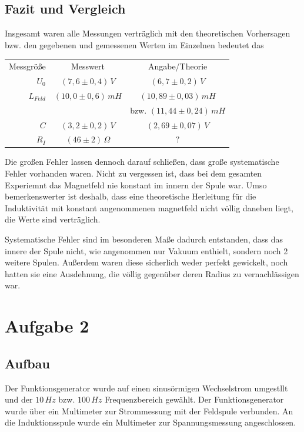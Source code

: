 \documentclass{article}
\begin{document}
\subsection{Fazit und Vergleich}
Insgesamt waren alle Messungen verträglich mit den theoretischen Vorhersagen bzw. den gegebenen und gemessenen Werten im Einzelnen bedeutet das
\vspace{0.2cm}
\begin{center}
\begin{tabular}{r c c} 
  Messgröße & Messwert & Angabe/Theorie \\
  \(U_0\) & \( (7,6 \pm 0,4)\, V \) & \( (6,7 \pm 0,2)\, V \) \\
  \(L_{Feld}\) & \( (10,0 \pm 0,6)\, mH \) & \( (10,89 \pm 0,03)\, mH \)  \\
  & & bzw. \( (11,44 \pm 0,24)\, mH\) \\
  \(C\) & \( (3,2 \pm 0,2)\, V \) & \( (2,69 \pm 0,07)\, V \) \\
  \(R_I\) & \( (46 \pm 2)\, \Omega \) & \( ? \) \\
 \end{tabular}
\end{center}
\vspace{0.2cm}
Die großen Fehler lassen dennoch darauf schließen, dass große systematische Fehler vorhanden waren.   Nicht zu vergessen ist, dass bei dem gesamten Experiemnt das Magnetfeld nie konstant im innern der Spule war. Umso bemerkenswerter ist deshalb, dass eine theoretische Herleitung für die Induktivität mit konstant angenommenen magnetfeld nicht völlig daneben liegt, die Werte sind verträglich.

Systematische Fehler sind im besonderen Maße dadurch entstanden, dass das innere der Spule nicht, wie angenommen nur Vakuum enthielt, sondern noch 2 weitere Spulen. Außerdem waren diese sicherlich weder perfekt gewickelt, noch hatten sie eine Ausdehnung, die völlig gegenüber deren Radius zu vernachlässigen war.

\section{Aufgabe 2}
\subsection{Aufbau}
Der Funktionsgenerator wurde auf einen sinusörmigen Wechselstrom umgestllt und der \(10 \, Hz \) bzw. \(100 \, Hz \) Frequenzbereich gewählt. Der Funktionsgenerator wurde über ein Multimeter zur Strommessung mit der Feldspule verbunden. An die Induktionsspule wurde ein Multimeter zur Spannungsmessung angeschlossen.
\end{document}
